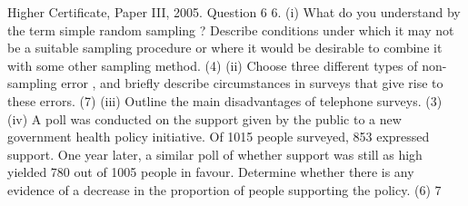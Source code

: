 \documentclass[a4paper,12pt]{article}
\begin{document}
Higher Certificate, Paper III, 2005. Question 6
6.
(i) What do you understand by the term simple random sampling ? Describe
conditions under which it may not be a suitable sampling procedure or where it
would be desirable to combine it with some other sampling method.
(4)
(ii) Choose three different types of non-sampling error , and briefly describe
circumstances in surveys that give rise to these errors.
(7)
(iii) Outline the main disadvantages of telephone surveys.
(3)
(iv)
A poll was conducted on the support given by the public to a new government
health policy initiative. Of 1015 people surveyed, 853 expressed support. One
year later, a similar poll of whether support was still as high yielded 780 out of
1005 people in favour. Determine whether there is any evidence of a decrease
in the proportion of people supporting the policy.
(6)
7
\end{document}
